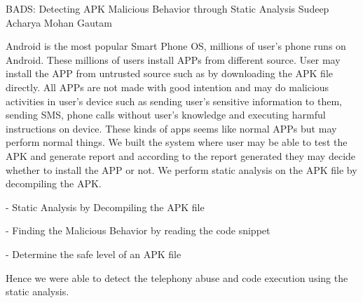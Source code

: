  \begin{conf-abstract}[]
 {BADS: Detecting APK Malicious Behavior  through Static Analysis}
 { Sudeep Acharya
 	Mohan Gautam
 }
{}

Android is the most popular Smart Phone OS, millions of user’s phone runs on Android. These millions of users install APPs from different source. User may install the APP from untrusted source such as by downloading the APK file directly. All APPs are not made with good intention and may do malicious activities in user’s device such as sending user’s sensitive information to them, sending SMS, phone calls without user’s knowledge and executing harmful instructions on device. These kinds of apps seems like normal APPs but may perform normal things. 
We built the system where user may be able to test the APK and generate report and according to the report generated they may decide whether to install the APP or not. We perform static analysis on the APK file by decompiling the APK.

- Static Analysis by Decompiling the APK file

- Finding the Malicious Behavior by reading the code snippet

- Determine the safe level of an APK file

Hence we were able to detect the telephony abuse and code execution using the static analysis.

\end{conf-abstract}